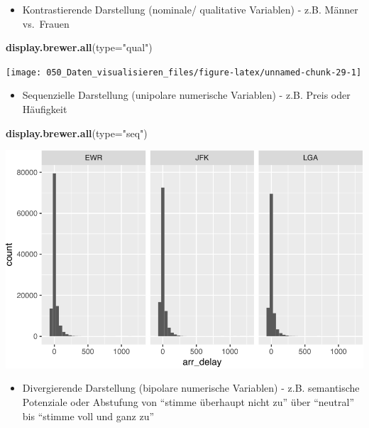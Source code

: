 \documentclass[12pt,]{book}
\newenvironment{Shaded}{\begin{snugshade}}{\end{snugshade}}
\newcommand{\KeywordTok}[1]{\textcolor[rgb]{0.13,0.29,0.53}{\textbf{{#1}}}}
\newcommand{\DataTypeTok}[1]{\textcolor[rgb]{0.13,0.29,0.53}{{#1}}}
\newcommand{\StringTok}[1]{\textcolor[rgb]{0.31,0.60,0.02}{{#1}}}
\newcommand{\NormalTok}[1]{{#1}}
\providecommand{\tightlist}{%
  \setlength{\itemsep}{0pt}\setlength{\parskip}{0pt}}
\begin{document}
\begin{itemize}
\tightlist
\item
  Kontrastierende Darstellung (nominale/ qualitative Variablen) - z.B.
  Männer vs.~Frauen
\end{itemize}

\begin{Shaded}
\begin{Highlighting}[]
\KeywordTok{display.brewer.all}\NormalTok{(}\DataTypeTok{type=}\StringTok{"qual"}\NormalTok{)}
\end{Highlighting}
\end{Shaded}

\begin{center}\texttt{[image: 050\_Daten\_visualisieren\_files/figure-latex/unnamed-chunk-29-1]} \end{center}

\begin{itemize}
\tightlist
\item
  Sequenzielle Darstellung (unipolare numerische Variablen) - z.B. Preis
  oder Häufigkeit
\end{itemize}

\begin{Shaded}
\begin{Highlighting}[]
\KeywordTok{display.brewer.all}\NormalTok{(}\DataTypeTok{type=}\StringTok{"seq"}\NormalTok{)}
\end{Highlighting}
\end{Shaded}

\begin{center}\includegraphics[width=1\linewidth]{050_Daten_visualisieren_files/figure-latex/unnamed-chunk-30-1} \end{center}

\begin{itemize}
\tightlist
\item
  Divergierende Darstellung (bipolare numerische Variablen) - z.B.
  semantische Potenziale oder Abstufung von ``stimme überhaupt nicht
  zu'' über ``neutral'' bis ``stimme voll und ganz zu''
\end{itemize}
\end{document}
